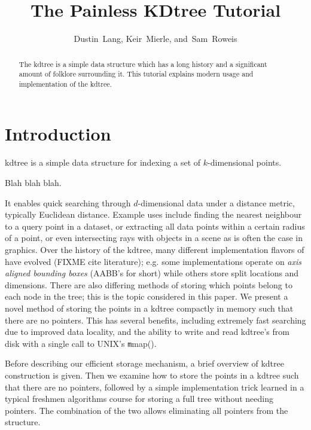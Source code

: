 \documentclass[journal]{IEEEtran}
\begin{document}
\title{The Painless KDtree Tutorial}
\author{Dustin~Lang,
        Keir~Mierle,
        and~Sam~Roweis}%
\maketitle

\begin{abstract}
  The kdtree is a simple data structure which has a long history and a
  significant amount of folklore surrounding it.
  This tutorial explains modern usage and implementation of the kdtree.
\end{abstract}

\section{Introduction}
 kdtree is a simple data structure for indexing a set of
$k$-dimensional points.

Blah blah blah.





  It enables quick searching through $d$-dimensional data
under a distance metric, typically Euclidean distance.  Example uses
include finding the nearest neighbour to a query point in a dataset, or
extracting all data points within a certain radius of a point, or even
intersecting rays with objects in a scene as is often the case in graphics.
Over the history of the kdtree, many different implementation flavors of have
evolved (FIXME cite literature); e.g. some implementations operate on {\em axis
aligned bounding boxes} (AABB's for short) while others store split locations
and dimensions. There are also differing methods of storing which points belong
to each node in the tree; this is the topic considered in this paper. We
present a novel method of storing the points in a kdtree compactly in memory
such that there are no pointers. This has several benefits, including extremely
fast searching due to improved data locality, and the ability to write and read
kdtree's from disk with a single call to UNIX's {\texttt mmap()}.

Before describing our efficient storage mechanism, a brief overview of kdtree
construction is given. Then we examine how to store the points in a kdtree such
that there are no pointers, followed by a simple implementation trick learned
in a typical freshmen algorithms course for storing a full tree without needing
pointers.  The combination of the two allows eliminating all pointers from the
structure.
\end{document}
